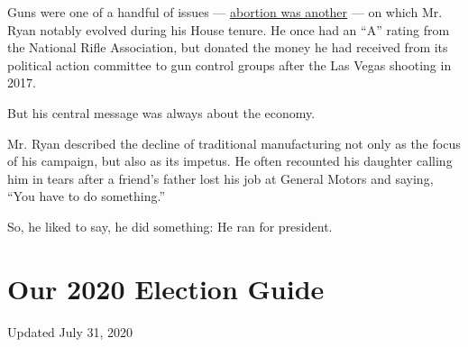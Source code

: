 Guns were one of a handful of issues ---
\href{https://www.beaconjournal.com/article/20150128/OPINION/301288829}{abortion
was another} --- on which Mr. Ryan notably evolved during his House
tenure. He once had an ``A'' rating from the National Rifle Association,
but donated the money he had received from its political action
committee to gun control groups after the Las Vegas shooting in 2017.

But his central message was always about the economy.

Mr. Ryan described the decline of traditional manufacturing not only as
the focus of his campaign, but also as its impetus. He often recounted
his daughter calling him in tears after a friend's father lost his job
at General Motors and saying, ``You have to do something.''

So, he liked to say, he did something: He ran for president.

\hypertarget{our-2020-election-guide}{%
\section{Our 2020 Election Guide}\label{our-2020-election-guide}}

Updated July 31, 2020

